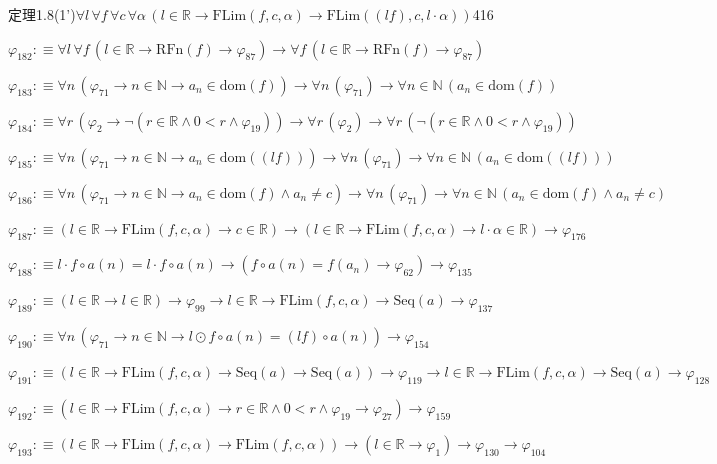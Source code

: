 \begin{fullproof}{定理1.8(1')}{$\forall l\,\forall f\,\forall c\,\forall \alpha\,(l \in \mathbb{R} \to \mathrm{FLim}(f,c,\alpha) \to \mathrm{FLim}((l f),c,l \cdot \alpha))$}{416}
\begin{abbrevlist}
\item $\varphi_{182} :\equiv \forall l\,\forall f\,(l \in \mathbb{R} \to \mathrm{RFn}(f) \to \varphi_{87}) \to \forall f\,(l \in \mathbb{R} \to \mathrm{RFn}(f) \to \varphi_{87})$
\item $\varphi_{183} :\equiv \forall n\,(\varphi_{71} \to n \in \mathbb{N} \to a_{n} \in \mathrm{dom}(f)) \to \forall n\,(\varphi_{71}) \to \forall n \in \mathbb{N}\,(a_{n} \in \mathrm{dom}(f))$
\item $\varphi_{184} :\equiv \forall r\,(\varphi_{2} \to \neg (r \in \mathbb{R} \land 0 < r \land \varphi_{19})) \to \forall r\,(\varphi_{2}) \to \forall r\,(\neg (r \in \mathbb{R} \land 0 < r \land \varphi_{19}))$
\item $\varphi_{185} :\equiv \forall n\,(\varphi_{71} \to n \in \mathbb{N} \to a_{n} \in \mathrm{dom}((l f))) \to \forall n\,(\varphi_{71}) \to \forall n \in \mathbb{N}\,(a_{n} \in \mathrm{dom}((l f)))$
\item $\varphi_{186} :\equiv \forall n\,(\varphi_{71} \to n \in \mathbb{N} \to a_{n} \in \mathrm{dom}(f) \land a_{n} \neq c) \to \forall n\,(\varphi_{71}) \to \forall n \in \mathbb{N}\,(a_{n} \in \mathrm{dom}(f) \land a_{n} \neq c)$
\item $\varphi_{187} :\equiv (l \in \mathbb{R} \to \mathrm{FLim}(f,c,\alpha) \to c \in \mathbb{R}) \to (l \in \mathbb{R} \to \mathrm{FLim}(f,c,\alpha) \to l \cdot \alpha \in \mathbb{R}) \to \varphi_{176}$
\item $\varphi_{188} :\equiv l \cdot f \circ a(n) = l \cdot f \circ a(n) \to (f \circ a(n) = f(a_{n}) \to \varphi_{62}) \to \varphi_{135}$
\item $\varphi_{189} :\equiv (l \in \mathbb{R} \to l \in \mathbb{R}) \to \varphi_{99} \to l \in \mathbb{R} \to \mathrm{FLim}(f,c,\alpha) \to \mathrm{Seq}(a) \to \varphi_{137}$
\item $\varphi_{190} :\equiv \forall n\,(\varphi_{71} \to n \in \mathbb{N} \to l \odot f \circ a(n) = (l f) \circ a(n)) \to \varphi_{154}$
\item $\varphi_{191} :\equiv (l \in \mathbb{R} \to \mathrm{FLim}(f,c,\alpha) \to \mathrm{Seq}(a) \to \mathrm{Seq}(a)) \to \varphi_{119} \to l \in \mathbb{R} \to \mathrm{FLim}(f,c,\alpha) \to \mathrm{Seq}(a) \to \varphi_{128}$
\item $\varphi_{192} :\equiv (l \in \mathbb{R} \to \mathrm{FLim}(f,c,\alpha) \to r \in \mathbb{R} \land 0 < r \land \varphi_{19} \to \varphi_{27}) \to \varphi_{159}$
\item $\varphi_{193} :\equiv (l \in \mathbb{R} \to \mathrm{FLim}(f,c,\alpha) \to \mathrm{FLim}(f,c,\alpha)) \to (l \in \mathbb{R} \to \varphi_{1}) \to \varphi_{130} \to \varphi_{104}$

\end{abbrevlist}
\end{fullproof}
